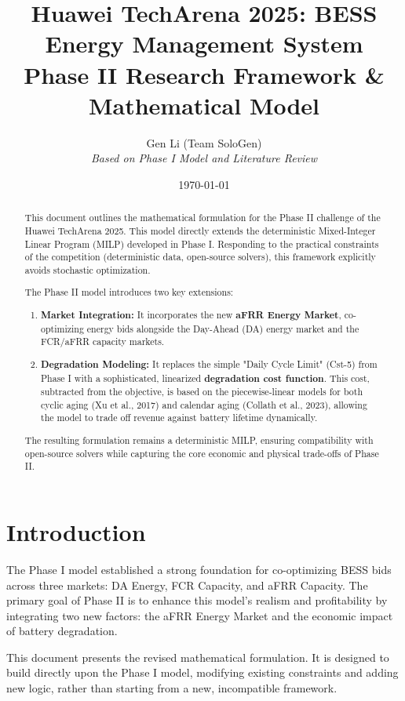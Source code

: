 \documentclass[11pt, a4paper]{article}
\title{Huawei TechArena 2025: BESS Energy Management System \\ \large Phase II Research Framework \& Mathematical Model}
\author{Gen Li (Team SoloGen) \\ \small \textit{Based on Phase I Model and Literature Review}}
\date{\today} %
\begin{document}
\maketitle
\thispagestyle{fancy}

\begin{abstract}
This document outlines the mathematical formulation for the Phase II challenge of the Huawei TechArena 2025. This model directly extends the deterministic Mixed-Integer Linear Program (MILP) developed in Phase I. Responding to the practical constraints of the competition (deterministic data, open-source solvers), this framework explicitly avoids stochastic optimization.

The Phase II model introduces two key extensions:
\begin{enumerate}
    \item \textbf{Market Integration:} It incorporates the new \textbf{aFRR Energy Market}, co-optimizing energy bids alongside the Day-Ahead (DA) energy market and the FCR/aFRR capacity markets.
    \item \textbf{Degradation Modeling:} It replaces the simple "Daily Cycle Limit" (Cst-5) from Phase I with a sophisticated, linearized \textbf{degradation cost function}. This cost, subtracted from the objective, is based on the piecewise-linear models for both cyclic aging (Xu et al., 2017) and calendar aging (Collath et al., 2023), allowing the model to trade off revenue against battery lifetime dynamically.
\end{enumerate}
The resulting formulation remains a deterministic MILP, ensuring compatibility with open-source solvers while capturing the core economic and physical trade-offs of Phase II.
\end{abstract}

\section{Introduction}
The Phase I model established a strong foundation for co-optimizing BESS bids across three markets: DA Energy, FCR Capacity, and aFRR Capacity. The primary goal of Phase II is to enhance this model's realism and profitability by integrating two new factors: the aFRR Energy Market and the economic impact of battery degradation.

This document presents the revised mathematical formulation. It is designed to build directly upon the Phase I model, modifying existing constraints and adding new logic, rather than starting from a new, incompatible framework.
\end{document}

